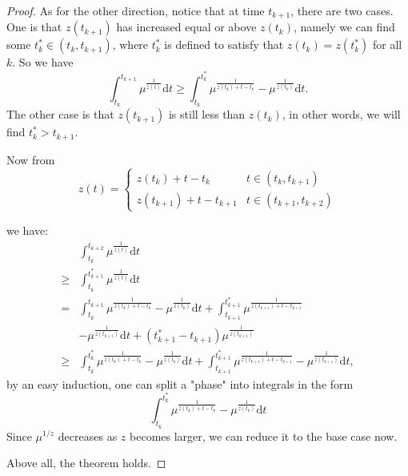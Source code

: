 \documentclass[12pt,abstract=true]{scrartcl}
\numberwithin{equation}{section}
\theoremstyle{definition}   \newtheorem{definition}{Definition}[section]
\theoremstyle{plain}        \newtheorem{theorem}{Theorem}[section]
\theoremstyle{plain}        \newtheorem{observation}{Observation}[section]
\theoremstyle{plain}        \newtheorem{fact}{Fact}[section]
\theoremstyle{plain}        \newtheorem{claim}{Claim}[section]
\theoremstyle{plain}        \newtheorem{lemma}[theorem]{Lemma}
\theoremstyle{plain}        \newtheorem{corollary}[theorem]{Corollary}
\theoremstyle{remark}       \newtheorem{example}{Example}[section]
\theoremstyle{remark}       \newtheorem{remark}{Remark}[section]
\begin{document}
\begin{proof}
As for the other direction, notice that at time $t_{k+1}$, there are two cases. One is that $z(t_{k+1})$ has increased equal or above $z(t_k)$, namely we can find some $t_k^*\in (t_k, t_{k+1})$, where $t_k^*$ is defined to satisfy that $z(t_k)=z(t_k^*)$ for all $k$. So we have
\begin{equation}
\int_{t_k}^{t_{k+1}} \mu^{\frac{1}{z(t)}} \mathrm{d}t \ge \int_{t_k}^{t_k^*}
\mu^{\frac{1}{z(t_k)+t-t_k}} - \mu^{\frac{1}{z(t_{k})}}\mathrm{d}t.
\end{equation}
The other case is that $z(t_{k+1})$ is still less than $z(t_{k})$, in other words, we will find $t_k^*>t_{k+1}$.  

Now from
\begin{equation}
z(t)=
\begin{cases}
z(t_k)+t-t_k&  t\in (t_k, t_{k+1})\\
z(t_{k+1})+t-t_{k+1}& t\in (t_{k+1}, t_{k+2})
\end{cases}
\end{equation}

we have:
\begin{equation}
\begin{split}
&\int_{t_k}^{t_{k+2}} \mu^{\frac{1}{z(t)}} \mathrm{d}t\\
\ge{}& \int_{t_k}^{t_{k+1}^*} \mu^{\frac{1}{z(t)}} \mathrm{d}t \\
={}&\int_{t_k}^{t_{k+1}} \mu^{\frac{1}{z(t_k)+t-t_k}} - \mu^{\frac{1}{z(t_{k})}}
\mathrm{d}t+ \int_{t_{k+1}}^{t_{k+1}^*} \mu^{\frac{1}{z(t_{k+1})+t-t_{k+1}}}\\& -
\mu^{\frac{1}{z(t_{k+1})}} \mathrm{d}t + (t_{k+1}^*-t_{k+1})\mu^{\frac{1}{z(t_{k+1})}}\\
\ge{}& \int_{t_k}^{t_{k}^*} \mu^{\frac{1}{z(t_k)+t-t_k}} -
\mu^{\frac{1}{z(t_{k})}}\mathrm{d}t + \int_{t_{k+1}}^{t_{k+1}^*}
\mu^{\frac{1}{z(t_{k+1})+t-t_{k+1}}} - \mu^{\frac{1}{z(t_{k+1})}}\mathrm{d}t,
\end{split}
\end{equation}
by an easy induction, one can split a "phase" into integrals in the form 
\begin{equation}
\int_{t_k}^{t_{k}^*} \mu^{\frac{1}{z(t_k)+t-t_k}} - \mu^{\frac{1}{z(t_{k})}}\mathrm{d}t
\end{equation}
 Since $ \mu^{1/z}$ decreases as $z$ becomes larger, we can reduce it to the base case now.

Above all, the theorem holds.
\end{proof}
\end{document}
